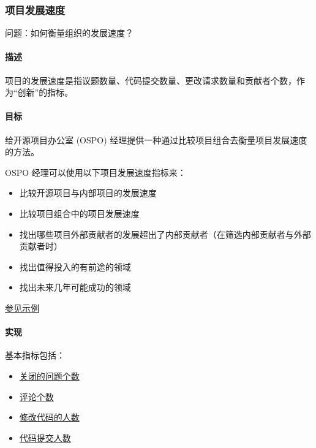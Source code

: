 \hypertarget{ux9879ux76eeux53d1ux5c55ux901fux5ea6}{%
\subsubsection{项目发展速度}\label{ux9879ux76eeux53d1ux5c55ux901fux5ea6}}

问题：如何衡量组织的发展速度？

\hypertarget{ux63cfux8ff0}{%
\paragraph{描述}\label{ux63cfux8ff0}}

项目的发展速度是指议题数量、代码提交数量、更改请求数量和贡献者个数，作为``创新''的指标。

\hypertarget{ux76eeux6807}{%
\paragraph{目标}\label{ux76eeux6807}}

给开源项目办公室 (OSPO)
经理提供一种通过比较项目组合去衡量项目发展速度的方法。

OSPO 经理可以使用以下项目发展速度指标来：

\begin{itemize}
\tightlist
\item
  比较开源项目与内部项目的发展速度
\item
  比较项目组合中的项目发展速度
\item
  找出哪些项目外部贡献者的发展超出了内部贡献者（在筛选内部贡献者与外部贡献者时）
\item
  找出值得投入的有前途的领域
\item
  找出未来几年可能成功的领域
\end{itemize}

\href{https://www.cncf.io/blog/2017/06/05/30-highest-velocity-open-source-projects}{参见示例}

\hypertarget{ux5b9eux73b0}{%
\paragraph{实现}\label{ux5b9eux73b0}}

基本指标包括：

\begin{itemize}
\tightlist
\item
  \href{https://github.com/chaoss/wg-evolution/blob/master/metrics/Issues_Closed.md}{关闭的问题个数}
\item
  \href{https://github.com/chaoss/wg-evolution/blob/master/metrics/Reviews.md}{评论个数}
\item
  \href{https://github.com/chaoss/wg-evolution/blob/master/metrics/Code_Changes.md}{修改代码的人数}
\item
  \href{https://github.com/chaoss/wg-risk/blob/master/metrics/Committers.md}{代码提交人数}
\end{itemize}

